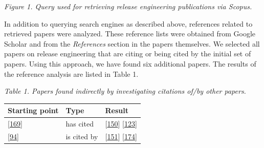 \documentclass[]{book}
\begin{document}
\emph{Figure 1. Query used for retrieving release engineering
publications via Scopus.}

In addition to querying search engines as described above, references
related to retrieved papers were analyzed. These reference lists were
obtained from Google Scholar and from the \emph{References} section in
the papers themselves. We selected all papers on release engineering
that are citing or being cited by the initial set of papers. Using this
approach, we have found six additional papers. The results of the
reference analysis are listed in Table 1.

\emph{Table 1. Papers found indirectly by investigating citations of/by
other papers.}

\begin{longtable}[]{@{}lll@{}}
\toprule
\begin{minipage}[b]{0.23\columnwidth}\raggedright\strut
Starting point\strut
\end{minipage} & \begin{minipage}[b]{0.18\columnwidth}\raggedright\strut
Type\strut
\end{minipage} & \begin{minipage}[b]{0.25\columnwidth}\raggedright\strut
Result\strut
\end{minipage}\tabularnewline
\midrule
\endhead
\begin{minipage}[t]{0.23\columnwidth}\raggedright\strut
{[}\protect\hyperlink{ref-souza2015a}{169}{]}\strut
\end{minipage} & \begin{minipage}[t]{0.18\columnwidth}\raggedright\strut
has cited\strut
\end{minipage} & \begin{minipage}[t]{0.25\columnwidth}\raggedright\strut
{[}\protect\hyperlink{ref-plewnia2014a}{150}{]}
{[}\protect\hyperlink{ref-mantyla2015a}{123}{]}\strut
\end{minipage}\tabularnewline
\begin{minipage}[t]{0.23\columnwidth}\raggedright\strut
{[}\protect\hyperlink{ref-khomh2015a}{94}{]}\strut
\end{minipage} & \begin{minipage}[t]{0.18\columnwidth}\raggedright\strut
is cited by\strut
\end{minipage} & \begin{minipage}[t]{0.25\columnwidth}\raggedright\strut
{[}\protect\hyperlink{ref-poo-caamano2016a}{151}{]}
{[}\protect\hyperlink{ref-teixeira2017a}{174}{]}\strut
\end{minipage}\tabularnewline

\end{longtable}
\end{document}
